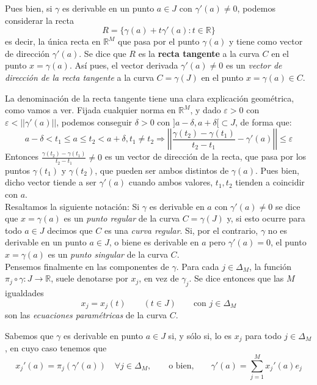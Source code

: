 \documentclass[a4paper, 12pt]{article}
\begin{document}
\begin{enumerate}[label=\textbf{\arabic*}.]
\begin{enumerate}
Pues bien, si \(\gamma\) es derivable en un punto \(a \in J\) con \(\gamma'(a) \neq 0\), podemos considerar la recta
\[
	R = \{ \gamma(a) + t \gamma' (a) : t \in \mathbb{R}\}
\]
es decir, la única recta en \(\mathbb{R}^M\) que pasa por el punto \(\gamma(a)\) y tiene como vector de dirección \(\gamma'(a)\). Se dice que \(R\) es la \textbf{recta tangente} a la curva \(C\) en el punto \(x = \gamma(a)\). Así pues, el vector derivada \(\gamma'(a) \neq 0\) es un \textit{vector de dirección de la recta tangente} a la curva \(C = \gamma(J)\) en el punto \(x = \gamma(a) \in C\).

La denominación de la recta tangente tiene una clara explicación geométrica, como vamos a ver. Fijada cualquier norma en \(\mathbb{R}^M\), y dado \(\varepsilon > 0\) con \(\varepsilon < || \gamma'(a)||\), podemos conseguir \(\delta >0\) con \( ] a - \delta, a + \delta[ \subset J\), de forma que:
\[
	a - \delta < t_1 \leq a \leq t_2 < a + \delta, t_1 \neq t_2 \Rightarrow \left| \left| \frac{\gamma (t_2) - \gamma (t_1)}{t_2 - t_1} - \gamma'(a) \right| \right| \leq \varepsilon
\]
Entonces \(\frac{\gamma(t_2) - \gamma (t_1)}{t_2 - t_1} \neq 0\) es un vector de dirección de la recta, que pasa por los puntos \(\gamma(t_1)\) y \(\gamma(t_2)\), que pueden ser ambos distintos de \(\gamma(a)\). Pues bien, dicho vector tiende a ser \(\gamma'(a)\) cuando ambos valores, \(t_1, t_2\) tienden a coincidir con \(a\). \\

Resaltamos la siguiente notación: Si \(\gamma\) es derivable en \(a\) con \(\gamma'(a) \neq 0\) se dice que \(x = \gamma(a)\) es un \textit{punto regular} de la curva \(C = \gamma(J)\) y, si esto ocurre para todo \(a \in J\) decimos que \(C\) es una \textit{curva regular}. Si, por el contrario, \(\gamma\) no es derivable en un punto \(a \in J\), o biene es derivable en \(a\) pero \(\gamma'(a) = 0\), el punto \(x = \gamma(a)\) es un \textit{punto singular} de la curva \(C\). \\

Pensemos finalmente en las componentes de \(\gamma\). Para cada \(j \in \Delta_M\), la función \\ \(\pi_j \circ \gamma: J \to \mathbb{R}\), suele denotarse por \(x_j\), en vez de \(\gamma_j\). Se dice entonces que las \(M\) igualdades
\[
	x_j = x_j(t) \qquad (t \in J) \qquad \text{con } j \in \Delta_M
\]
son las \textit{ecuaciones paramétricas} de la curva \(C\).

Sabemos que \(\gamma\) es derivable en punto \(a \in J\) si, y sólo si, lo es \(x_j\) para todo \(j \in \Delta_M\), en cuyo caso tenemos que
\[
	x_j' (a) = \pi_j (\gamma'(a)) \quad \forall j \in \Delta_M, \qquad \text{o bien,} \qquad \gamma'(a) = \sum_{j=1}^{M} x_j' (a) e_j
\]


\end{enumerate}
\end{enumerate}
\end{document}

